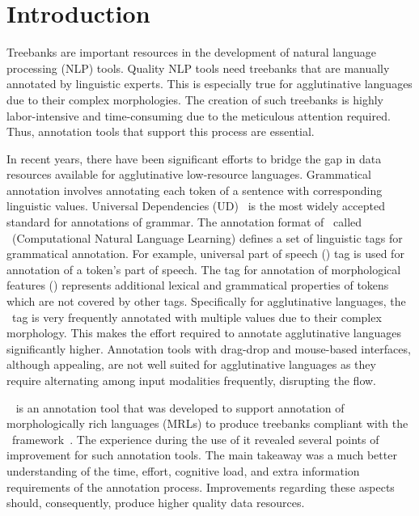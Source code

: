 \section{Introduction}
\label{sec:introduction}

Treebanks are important resources in the development of natural language processing (NLP) tools.
Quality NLP tools need treebanks that are manually annotated by linguistic experts.
This is especially true for agglutinative languages due to their complex morphologies.
The creation of such treebanks is highly labor-intensive and time-consuming due to the meticulous attention required.
Thus, annotation tools that support this process are essential.

In recent years, there have been significant efforts to bridge the gap in data resources available for agglutinative low-resource languages.
Grammatical annotation involves annotating each token of a sentence with corresponding linguistic values.
Universal Dependencies (UD)~\cite{UD} is the most widely accepted standard for annotations of grammar.
The annotation format of \ud\ called \conllu\ (Computational Natural Language Learning) defines a set of linguistic tags for grammatical annotation.
For example, universal part of speech (\upos) tag is used for annotation of a token's part of speech.
The tag for annotation of morphological features (\feats) represents additional lexical and grammatical properties of tokens which are not covered by other tags.
Specifically for agglutinative languages, the \feats\ tag is very frequently annotated with multiple values due to their complex morphology.
This makes the effort required to annotate agglutinative languages significantly higher.
Annotation tools with drag-drop and mouse-based interfaces, although appealing, are not well suited for agglutinative languages as they require alternating among input modalities frequently, disrupting the flow.

\boatvone~\cite{turk-2021-boat} is an annotation tool that was developed to support annotation of morphologically rich languages (MRLs) to produce treebanks compliant with the \ud\ framework~\cite{UD}.
The experience during the use of it revealed several points of improvement for such annotation tools.
The main takeaway was a much better understanding of the time, effort, cognitive load, and extra information requirements of the annotation process.
Improvements regarding these aspects should, consequently, produce higher quality data resources.

